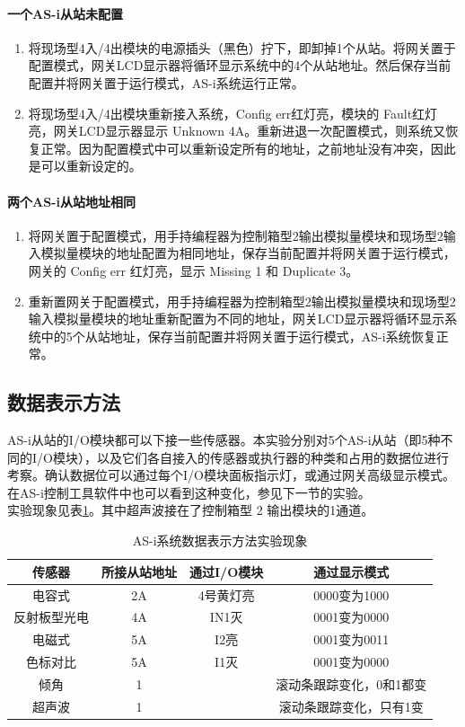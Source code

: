 \paragraph{一个AS-i从站未配置}
\begin{enumerate}
\item 将现场型4入/4出模块的电源插头（黑色）拧下，即卸掉1个从站。将网关置于配置模式，网关LCD显示器将循环显示系统中的4个从站地址。然后保存当前配置并将网关置于运行模式，AS-i系统运行正常。
\item 将现场型4入/4出模块重新接入系统，Config err红灯亮，模块的 {\ttfamily Fault}红灯亮，网关LCD显示器显示 {\ttfamily Unknown 4A}。重新进退一次配置模式，则系统又恢复正常。因为配置模式中可以重新设定所有的地址，之前地址没有冲突，因此是可以重新设定的。
\end{enumerate}
\paragraph{两个AS-i从站地址相同}
\begin{enumerate}
\item 将网关置于配置模式，用手持编程器为控制箱型2输出模拟量模块和现场型2输入模拟量模块的地址配置为相同地址，保存当前配置并将网关置于运行模式，网关的 Config err 红灯亮，显示 {\ttfamily Missing 1} 和 {\ttfamily Duplicate 3}。
\item 重新置网关于配置模式，用手持编程器为控制箱型2输出模拟量模块和现场型2输入模拟量模块的地址重新配置为不同的地址，网关LCD显示器将循环显示系统中的5个从站地址，保存当前配置并将网关置于运行模式，AS-i系统恢复正常。
\end{enumerate}

\subsection{数据表示方法}
AS-i从站的I/O模块都可以下接一些传感器。本实验分别对5个AS-i从站（即5种不同的I/O模块），以及它们各自接入的传感器或执行器的种类和占用的数据位进行考察。确认数据位可以通过每个I/O模块面板指示灯，或通过网关高级显示模式。在AS-i控制工具软件中也可以看到这种变化，参见下一节的实验。\\
实验现象见表\ref{tab:dr}。其中超声波接在了控制箱型 2 输出模块的1通道。
\begin{table}[htbp]
\centering
\begin{tabular}{|c|c|c|c|}
	\hline
	传感器 & 所接从站地址 & 通过I/O模块 & 通过显示模式 \\
	\hline
	电容式 & 2A & 4号黄灯亮 & 0000变为1000 \\
	反射板型光电 & 4A & IN1灭 & 0001变为0000 \\
	电磁式 & 5A & I2亮 & 0001变为0011 \\
	色标对比 & 5A & I1灭 & 0001变为0000 \\
	倾角 & 1 & & 滚动条跟踪变化，0和1都变\\
	超声波 & 1 & & 滚动条跟踪变化，只有1变 \\
	\hline
\end{tabular}
\caption{AS-i系统数据表示方法实验现象}
\label{tab:dr}
\end{table}

